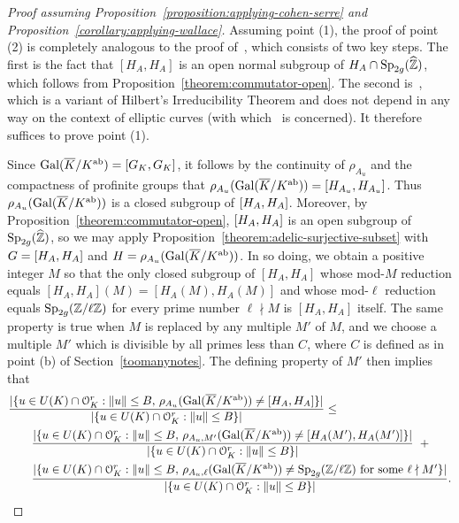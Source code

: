 	\begin{proof}[Proof assuming Proposition~\ref{proposition:applying-cohen-serre} and Proposition~\ref{corollary:applying-wallace}]
		Assuming point (1), the proof of point (2) is completely analogous to the proof of~\cite[Proposition 7.9(ii)]{zywina2010hilbert}, which consists of two key steps. The first is the fact that $[H_A, H_A]$ is an open normal subgroup of $H_A \cap \operatorname{Sp}_{2g}(\widehat{\mathbb Z})$, which follows from Proposition~\ref{theorem:commutator-open}. The second is~\cite[Proposition 7.7]{zywina2010hilbert}, which is a variant of Hilbert's Irreducibility Theorem and does not depend in any way on the context of elliptic curves (with which~\cite[Section 7]{zywina2010hilbert} is concerned). It therefore suffices to prove point (1).

Since $\operatorname{Gal}(\overline{K}/K^{\text{ab}}) = [G_K, G_K]$, it follows by the continuity of $\rho_{A_u}$ and the compactness of profinite groups that $\rho_{A_u}(\operatorname{Gal}(\overline K/K^{\text{ab}})) = [H_{A_u}, H_{A_u}]$.
Thus $\rho_{A_u}(\operatorname{Gal}(\overline K/K^{\text{ab}}))$ is a closed subgroup of $\left[H_A, H_A \right]$. Moreover, by Proposition~\ref{theorem:commutator-open}, $[ H_A, H_A ]$ is an open subgroup of $\operatorname{Sp}_{2g}(\widehat{{\mathbb Z}})$, so we may apply Proposition~\ref{theorem:adelic-surjective-subset} with $G = [ H_A, H_A ]$ and $H = \rho_{A_u}(\operatorname{Gal}(\overline K/K^{\text{ab}}))$. In so doing, we obtain a positive integer $M$ so that the only closed subgroup of $[H_A, H_A]$ whose mod-$M$ reduction equals $[H_A, H_A](M) = [H_A(M), H_A(M)]$ and whose mod-$\ell$ reduction equals $\operatorname{Sp}_{2g}({\mathbb Z}/\ell \mathbb Z)$ for every prime number $\ell \nmid M$ is $[H_A, H_A]$ itself. The same property is true when $M$ is replaced by any multiple $M'$ of $M$, and we choose a multiple $M'$ which is divisible by all primes less than $C$, where $C$ is defined as in point (b) of Section~\ref{toomanynotes}. The defining property of $M'$ then implies that
\begin{align}
			& \frac{|\{ u \in U(K) \cap \mathcal O_K^r : \|u \| \leq B,\, \rho_{A_u}(\Gal(\overline K/K^{\ab})) \neq [ \mono_A, \mono_A ] \}|}{|\{ u \in U(K) \cap \mathcal O_K^r : \|u \| \leq B \} |} \leq \nonumber \\
			& \qquad  \frac{|\{ u \in U(K) \cap \mathcal O_K^r : \|u \| \leq B,\, \rho_{A_u, M'}(\Gal(\overline K/K^{\ab})) \neq [ \mono_A(M'), \mono_A(M') ] \}|}{|\{ u \in U(K) \cap \mathcal O_K^r : \|u \| \leq B \} |}\,\,+ \raisetag{-0.6cm}{\label{equation:goursat-m-bound}}\\
			& \qquad \frac{|\{ u \in U(K) \cap \mathcal O_K^r : \|u \| \leq B,\, \rho_{A_u, \ell}(\Gal(\overline K/K^{\ab})) \neq \Sp_{2g}(\mathbb Z/\ell \mathbb Z) \text{ for some } \ell \nmid M' \}|}{|\{ u \in U(K) \cap \mathcal O_K^r : \|u \| \leq B \} |} \raisetag{-0.6cm}{\label{equation:goursat-l-bound}}.

\end{align}
\end{proof}
